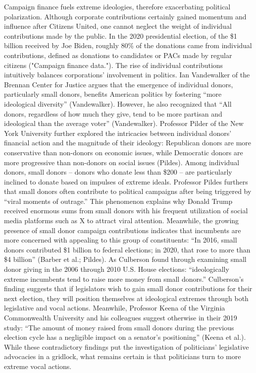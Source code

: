 Campaign finance fuels extreme ideologies, therefore exacerbating political polarization. Although corporate contributions certainly gained momentum and influence after Citizens United, one cannot neglect the weight of individual contributions made by the public. In the 2020 presidential election, of the \$1 billion received by Joe Biden, roughly 80\% of the donations came from individual contributions, defined as donations to candidates or PACs made by regular citizens ("Campaign finance data."). The rise of individual contributions intuitively balances corporations’ involvement in politics. Ian Vandewalker of the Brennan Center for Justice argues that the emergence of individual donors, particularly small donors, benefits American politics by fostering “more ideological diversity” (Vandewalker). However, he also recognized that “All donors, regardless of how much they give, tend to be more partisan and ideological than the average voter” (Vandewalker). Professor Pilder of the New York University further explored the intricacies between individual donors’ financial action and the magnitude of their ideology: Republican donors are more conservative than non-donors on economic issues, while Democratic donors are more progressive than non-donors on social issues (Pildes). Among individual donors, small donors – donors who donate less than \$200 – are particularly inclined to donate based on impulses of extreme ideals. Professor Pildes furthers that small donors often contribute to political campaigns after being triggered by “viral moments of outrage.” This phenomenon explains why Donald Trump received enormous sums from small donors with his frequent utilization of social media platforms such as X to attract viral attention. Meanwhile, the growing presence of small donor campaign contributions indicates that incumbents are more concerned with appealing to this group of constituents: “In 2016, small donors contributed \$1 billion to federal elections; in 2020, that rose to more than \$4 billion” (Barber et al.; Pildes). As Culberson found through examining small donor giving in the 2006 through 2010 U.S. House elections: “ideologically extreme incumbents tend to raise more money from small donors.” Culberson’s finding suggests that if legislators wish to gain small donor contributions for their next election, they will position themselves at ideological extremes through both legislative and vocal actions. Meanwhile, Professor Keena of the Virginia Commonwealth University and his colleagues suggest otherwise in their 2019 study: “The amount of money raised from small donors during the previous election cycle has a negligible impact on a senator’s positioning” (Keena et al.). While these contradictory findings put the investigation of politicians’ legislative advocacies in a gridlock, what remains certain is that politicians turn to more extreme vocal actions. 

